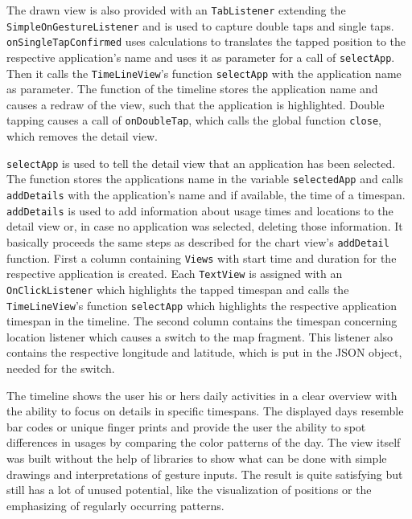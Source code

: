 The  drawn view is also provided with an \lstinline$TabListener$ extending the \lstinline$SimpleOnGestureListener$ and is used to capture double taps and single taps. \lstinline$onSingleTapConfirmed$ uses calculations to translates the tapped position to the respective application's name and uses it as parameter for a call of \lstinline$selectApp$. Then it calls the \lstinline$TimeLineView$'s function \lstinline$selectApp$ with the application name as parameter. The function of the timeline stores the application name and causes a redraw of the view, such that the application is highlighted. Double tapping causes a call of \lstinline$onDoubleTap$, which calls the global function \lstinline$close$, which removes the detail view.

\lstinline$selectApp$  is used to tell the detail view that an application has been selected. The function stores the applications name in the variable \lstinline$selectedApp$ and calls \lstinline$addDetails$ with the application's name and if available, the time of a timespan. \lstinline$addDetails$ is used to add information about usage times and locations to the detail view or, in case no application was selected, deleting those information. It basically proceeds the same steps as described for the chart view's \lstinline$addDetail$ function. First a column containing \lstinline$Views$ with start time and duration for the respective application is created. Each \lstinline$TextView$ is assigned with an \lstinline$OnClickListener$ which highlights the tapped timespan and calls the \lstinline$TimeLineView$'s function \lstinline$selectApp$ which highlights the respective application timespan in the timeline. The second column contains the timespan concerning location listener which causes a switch to the map fragment. This listener also contains the respective longitude and latitude, which is put in the JSON object, needed for the switch.

The timeline shows the user his or hers daily activities in a clear overview with the ability to focus on details in specific timespans. The displayed days resemble bar codes or unique finger prints and provide the user the ability to spot differences in usages by comparing the color patterns of the day. The view itself was built without the help of libraries to show what can be done with simple drawings and interpretations of gesture inputs. The result is quite satisfying but still has a lot of unused potential, like the visualization of positions or the emphasizing of regularly occurring patterns.